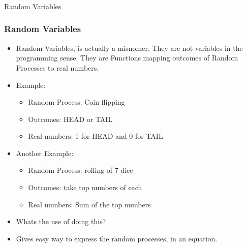 \begin{frame}[fragile]\frametitle{}
\begin{center}
{\Large Random Variables}
\end{center}
\end{frame}

\begin{frame}\frametitle{Random Variables}
\begin{itemize}
\item Random Variables, is actually a misnomer. They are not variables in the programming sense. They are Functions mapping outcomes of Random Processes to real numbers.
\item Example:
\begin{itemize}
\item Random Process: Coin flipping
\item Outcomes: HEAD or TAIL
\item Real numbers: 1 for HEAD and 0 for TAIL
\end{itemize}

\item Another Example:
\begin{itemize}
\item Random Process: rolling of 7 dice
\item Outcomes: take top numbers of each
\item Real numbers: Sum of the top numbers
\end{itemize}
\item Whats the use of doing this?
\item Gives easy way to express the random processes, in an equation.
\end{itemize}
\end{frame}

